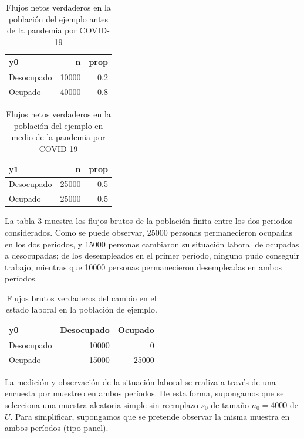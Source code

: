 \documentclass[
  12pt,
]{book}
\begin{document}
\begin{table}

\caption{\label{tab:tabsesgo2}Flujos netos verdaderos en la población del ejemplo antes de la pandemia por COVID-19}
\centering
\begin{tabular}[t]{l|r|r}
\hline
y0 & n & prop\\
\hline
Desocupado & 10000 & 0.2\\
\hline
Ocupado & 40000 & 0.8\\
\hline
\end{tabular}
\end{table}

\begin{table}

\caption{\label{tab:tabsesgo3}Flujos netos verdaderos en la población del ejemplo en medio de la pandemia por COVID-19}
\centering
\begin{tabular}[t]{l|r|r}
\hline
y1 & n & prop\\
\hline
Desocupado & 25000 & 0.5\\
\hline
Ocupado & 25000 & 0.5\\
\hline
\end{tabular}
\end{table}

La tabla \ref{tab:tabsesgo4} muestra los flujos brutos de la población finita entre los dos periodos considerados. Como se puede observar, 25000 personas permanecieron ocupadas en los dos periodos, y 15000 personas cambiaron su situación laboral de ocupadas a desocupadas; de los desempleados en el primer período, ninguno pudo conseguir trabajo, mientras que 10000 personas permanecieron desempleadas en ambos períodos.

\begin{table}

\caption{\label{tab:tabsesgo4}Flujos brutos verdaderos del cambio en el estado laboral en la población de ejemplo.}
\centering
\begin{tabular}[t]{l|r|r}
\hline
y0 & Desocupado & Ocupado\\
\hline
Desocupado & 10000 & 0\\
\hline
Ocupado & 15000 & 25000\\
\hline
\end{tabular}
\end{table}

La medición y observación de la situación laboral se realiza a través de una encuesta por muestreo en ambos períodos. De esta forma, supongamos que se selecciona una muestra aleatoria simple sin reemplazo \(s_0\) de tamaño \(n_0 = 4000\) de \(U\). Para simplificar, supongamos que se pretende observar la misma muestra en ambos períodos (tipo panel).
\end{document}
